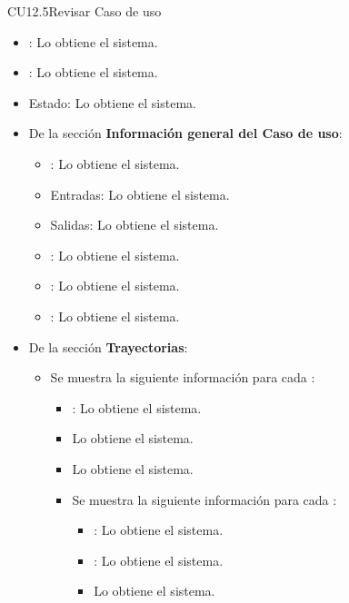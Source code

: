 \begin{UseCase}{CU12.5}{Revisar Caso de uso}
{\begin{itemize}
				\item {}: Lo obtiene el sistema.
				\item {}: Lo obtiene el sistema.
				\item Estado: Lo obtiene el sistema.
				\item De la sección \textbf{Información general del Caso de uso}: 
					\begin{itemize}
						\item {}: Lo obtiene el sistema.
						\item Entradas: Lo obtiene el sistema.
						\item Salidas: Lo obtiene el sistema.
						\item {}: Lo obtiene el sistema.
						\item {}: Lo obtiene el sistema.
						\item {}: Lo obtiene el sistema.
					\end{itemize}
				\item De la sección \textbf{Trayectorias}:
					\begin{itemize}
						\item Se muestra la siguiente información para cada :
							\begin{itemize}
								\item {}: Lo obtiene el sistema.
								\item {} Lo obtiene el sistema.
								\item {} Lo obtiene el sistema.
								\item Se muestra la siguiente información para cada :
									\begin{itemize}
										\item {}: Lo obtiene el sistema.
										\item {}: Lo obtiene el sistema.
										\item {} Lo obtiene el sistema.
									\end{itemize}

\end{itemize}
\end{itemize}
\end{itemize}}
\end{UseCase}
